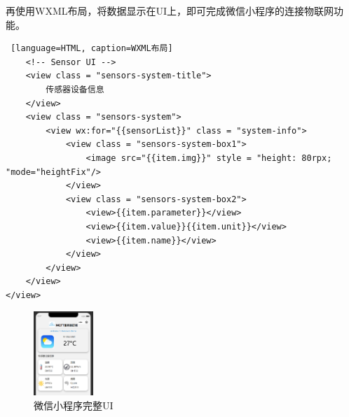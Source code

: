 再使用WXML布局，将数据显示在UI上，即可完成微信小程序的连接物联网功能。

\begin{lstlisting} [language=HTML, caption=WXML布局]
    <!-- Sensor UI -->
	<view class = "sensors-system-title">
		传感器设备信息
	</view>
	<view class = "sensors-system">
		<view wx:for="{{sensorList}}" class = "system-info">
			<view class = "sensors-system-box1">
				<image src="{{item.img}}" style = "height: 80rpx; "mode="heightFix"/>
			</view>
			<view class = "sensors-system-box2">
				<view>{{item.parameter}}</view>
				<view>{{item.value}}{{item.unit}}</view>
				<view>{{item.name}}</view>
			</view>
		</view>
	</view>
</view>
\end{lstlisting}

\begin{figure} [H]
    \centering
    \includegraphics[width=0.2\textwidth]{img/FullUI.png}
    \caption{微信小程序完整UI}
    \label{fig:WechatUI2}
\end{figure}